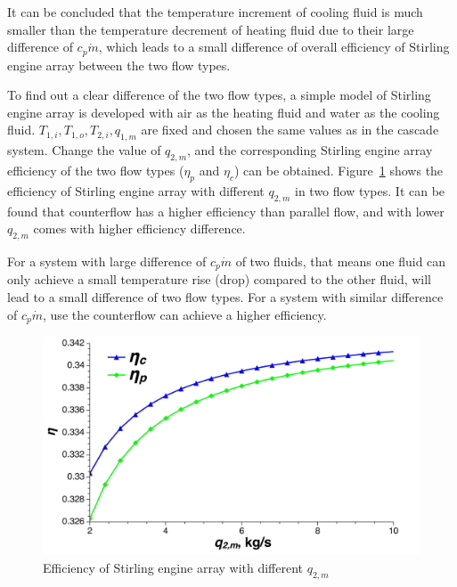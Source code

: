 It can be concluded that the temperature increment of cooling fluid is much smaller than the temperature decrement of heating fluid due to their large difference of $c_p\dot{m}$, which leads to a small difference of overall efficiency of Stirling engine array between the two flow types.

To find out a clear difference of the two flow types, a simple model of Stirling engine array is developed with air as the heating fluid and water as the cooling fluid. $T_{1,i}, T_{1,o}, T_{2,i}, q_{1,m}$ are fixed and chosen the same values as in the cascade system. Change the value of $q_{2,m}$, and the corresponding Stirling engine array efficiency of the two flow types ($\eta_p$ and $\eta_c$) can be obtained. Figure~\ref{fig:SEAflowtypes} shows the efficiency of Stirling engine array with different $q_{2,m}$ in two flow types. It can be found that counterflow has a higher efficiency than parallel flow, and with lower $q_{2,m}$ comes with higher efficiency difference.

For a system with large difference of $c_p\dot{m}$ of two fluids, that means one fluid can only achieve a small temperature rise (drop) compared to the other fluid, will lead to a small difference of two flow types. For a system with similar difference of $c_p\dot{m}$, use the counterflow can achieve a higher efficiency.

\noindent \begin{figure}[H]
\begin{center}
	\includegraphics[width = 0.8\columnwidth, angle = 0]{fig/SEAflowtypes}
	\caption{Efficiency of Stirling engine array with different $q_{2,m}$}
	\label{fig:SEAflowtypes}
\end{center}
\end{figure}

